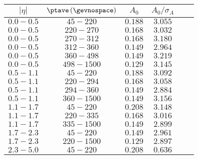 \begin{table}[!htb]
  \begin{center}
    \begin{tabular}{cccccc}
      \toprule
      $|\eta|$ & $\ptave \,(\gevnospace)$ & $A_{0}$ & $A_{0}/\sigma_{A}$ \\ 
      \midrule
      $0.0 - 0.5$ &  $45 - 220$ & $0.188$ & $3.055$ \\
      $0.0 - 0.5$ & $220 - 270$ & $0.168$ & $3.032$ \\
      $0.0 - 0.5$ & $270 - 312$ & $0.168$ & $3.180$ \\
      $0.0 - 0.5$ & $312 - 360$ & $0.149$ & $2.964$ \\
      $0.0 - 0.5$ & $360 - 498$ & $0.149$ & $3.219$ \\
      $0.0 - 0.5$ &$498 - 1500$ & $0.129$ & $3.145$ \\
      \midrule
      $0.5 - 1.1$ &  $45 - 220$ & $0.188$ & $3.092$ \\
      $0.5 - 1.1$ & $220 - 294$ & $0.168$ & $3.058$ \\
      $0.5 - 1.1$ & $294 - 360$ & $0.149$ & $2.884$ \\
      $0.5 - 1.1$ &$360 - 1500$ & $0.149$ & $3.156$ \\
      \midrule
      $1.1 - 1.7$ &  $45 - 220$ & $0.208$ & $3.148$ \\
      $1.1 - 1.7$ & $220 - 335$ & $0.168$ & $3.016$ \\
      $1.1 - 1.7$ &$335 - 1500$ & $0.149$ & $2.899$ \\
      \midrule
      $1.7 - 2.3$ &  $45 - 220$ & $0.149$ & $2.961$ \\
      $1.7 - 2.3$ & $220 - 1500$ & $0.129$ & $2.897$ \\
      \midrule
      $2.3 - 5.0$ &$45 - 220$ & $0.208$ & $0.636$ \\
      \bottomrule
    \end{tabular}
  \end{center}
\end{table}


